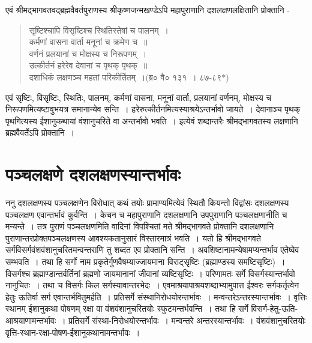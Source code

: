 {एवं श्रीमद्भागवतवद्ब्रह्मवैवर्तपुराणस्य श्रीकृष्णजन्मखण्डेऽपि महापुराणानि दशलक्षण\-लक्षितानि प्रोक्तानि -
\begin{verse}
सृष्टिश्चापि विसृष्टिश्च स्थितिस्तेषां च पालनम्~। \\
कर्मणां वासना वार्ता मनूनां च क्रमेण च~॥\\
वर्णनं प्रलयानां च मोक्षस्य च निरूपणम्~। \\
उत्कीर्तनं हरेरेव देवानां च पृथक् पृथक्~॥\\
दशाधिकं लक्षणञ्च महतां परिकीर्तितम्~।(ब्र० वै० १३१~। ८७-८९$*$)
\end{verse}
एवं सृष्टिः, विसृष्टिः, स्थितिः, पालनम्, कर्मणां वासना, मनूनां वार्ता, प्रलयानां वर्णनम्, मोक्षस्य च निरूपणमित्यष्टावुभयत्र समानान्येव सन्ति~। हरेरुत्कीर्तनमित्यस्याश्रयेऽन्तर्भावो जायते~। देवानाञ्च पृथक् पृथगित्यस्य ईशानुकथायां वंशानुचरिते वा अन्तर्भावो भवति~। इत्येवं शब्दान्तरैः श्रीमद्भागवतस्य लक्षणानि ब्रह्मवैवर्तेऽपि प्रोक्तानि~। 

\section*{पञ्चलक्षणे दशलक्षणस्यान्तर्भावः}

ननु दशलक्षणस्य पञ्चलक्षणेन विरोधात् कथं तयोः प्रामाण्यमित्येवं स्थितौ कियन्तो विद्वांसः दशलक्षणस्य पञ्चलक्षण एवान्तर्भावं कुर्वन्ति~। केचन च महापुराणानि दशलक्षणानि उपपुराणानि पञ्चलक्षणानीति च मन्यन्ते~। तत्र पुराणं पञ्चलक्षणमिति वादिनां विपश्चितां मते श्रीमद्भागवते प्रोक्तानि दशलक्षणानि पुराणान्तरप्रोक्तपञ्चलक्षणस्य आवश्यकतानुसारं विस्तारमात्रं भवति~। यतो हि श्रीमद्भागवते सर्गविसर्गवंशवंशानुचरितमन्वन्तराणि तु शब्दत एव प्रोक्तानि सन्ति~। अवशिष्टानामन्येषामप्यन्तर्भाव एतेष्वेव सम्भवति~। तथा हि सर्गो नाम प्रकृतेर्गुणवैषम्याज्जायमाना विराट्सृष्टिः (ब्रह्माण्डस्य समष्टिसृष्टिः)~। विसर्गश्च ब्रह्माण्डान्तर्वर्तिनां ब्रह्मणो जायमानानां जीवानां व्यष्टिसृष्टिः~। परिणामतः सर्गे विसर्गस्यान्तर्भावो नानुचितः~। तथा च विसर्गः किल सर्गस्यावान्तरभेदः~। एवमाश्रयापाश्रयशब्दाभ्यामुपात्त ईश्वरः सर्गकर्तृत्वेन हेतुः ऊतिर्वा सर्ग एवान्तर्भवितुमर्हति~। प्रतिसर्गे संस्थानिरोधयोरन्तर्भावः~। मन्वन्तरेऽन्तरस्यान्तर्भावः~। वृत्तिः स्थानम् ईशानुकथा पोषणम् रक्षा वा वंशवंशानुचरितयोः स्फुटमन्तर्भवन्ति~। तथा हि \enginline{-}
सर्गे विसर्ग-हेतु-ऊति-आश्रयाणामन्तर्भावः~। प्रतिसर्गे संस्था-निरोधयोरन्तर्भावः~। मन्वन्तरे अन्तरस्यान्तर्भावः~। 
वंशवंशानुचरितयोः वृत्ति-स्थान-रक्षा-पोषण-ईशानुकथानामन्तर्भावः~। 

}
